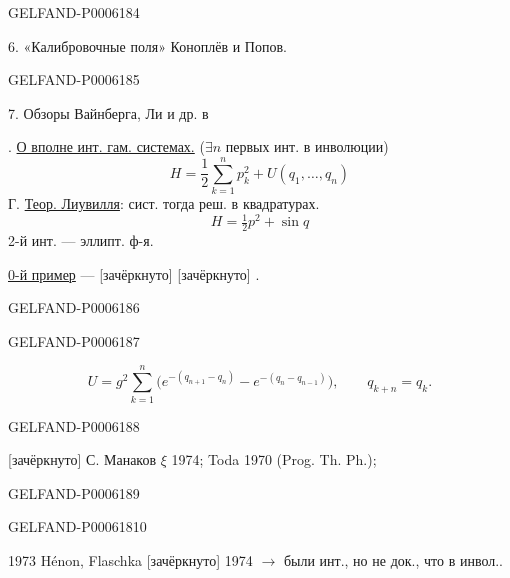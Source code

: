 \begin{GelfandAdjacentEvidence}{GELFAND-P000618}{4}

6. «Калибровочные поля» Коноплёв и Попов.
\end{GelfandAdjacentEvidence}
\begin{GelfandAdjacentEvidence}{GELFAND-P000618}{5}


7. Обзоры Вайнберга, Ли и др. в

. \underline{О вполне инт. гам. системах.}
(\(\exists n\) первых инт. в инволюции)
\[
H=\frac12\sum_{k=1}^n p_k^2+U(q_1,\ldots,q_n)
\]
Г. \underline{Теор. Лиувилля}: сист. тогда реш. в квадратурах.
\[
H=\tfrac12p^2+\sin q
\]
2-й инт. — эллипт. ф-я.

\underline{0-й пример} — [зачёркнуто] 
[зачёркнуто] .
\end{GelfandAdjacentEvidence}
\begin{GelfandAdjacentEvidence}{GELFAND-P000618}{6}

\end{GelfandAdjacentEvidence}
\begin{GelfandAdjacentEvidence}{GELFAND-P000618}{7}

\[
U=g^2\sum_{k=1}^{n}\bigl(e^{-(q_{n+1}-q_n)}-e^{-(q_n-q_{n-1})}\bigr),
\qquad q_{k+n}=q_k.
\]
\end{GelfandAdjacentEvidence}
\begin{GelfandAdjacentEvidence}{GELFAND-P000618}{8}


[зачёркнуто] С. Манаков \(\xi\) 1974; Toda 1970 (Prog. Th. Ph.);
\end{GelfandAdjacentEvidence}
\begin{GelfandAdjacentEvidence}{GELFAND-P000618}{9}

\end{GelfandAdjacentEvidence}
\begin{GelfandAdjacentEvidence}{GELFAND-P000618}{10}


1973 Hénon, Flaschka [зачёркнуто] 1974
\(\longrightarrow\) были инт., но не док., что в инвол..
\end{GelfandAdjacentEvidence}
